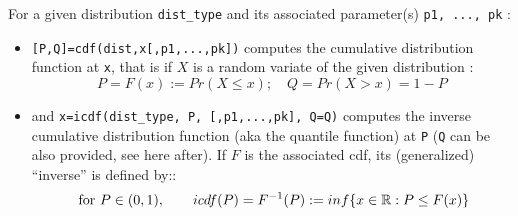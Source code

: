 \begin{mandescription}

For a given distribution \verb+dist_type+ and its associated parameter(s) \verb+p1, ..., pk+ :
\begin{itemize}
\item \verb![P,Q]=cdf(dist,x[,p1,...,pk])! computes the cumulative distribution function at \verb+x+, that
is if $X$ is a random variate of the given distribution :
$$
       P = F(x) := Pr ( X \le x ); \quad Q = Pr ( X > x ) = 1 - P
$$

\item and \verb!x=icdf(dist_type, P, [,p1,...,pk], Q=Q)! computes the inverse cumulative distribution function
(aka the quantile function) at \verb+P+ (\verb+Q+ can be also provided, see here after). If $F$ is the associated
cdf, its (generalized) ``inverse'' is defined by:: 
$$
\mbox{ for } P \in (0,1), \qquad   icdf(P) = F^{-1}(P) := inf \{ x \in \mathbb R : P \le F(x) \} 
$$
\end{itemize}


\end{mandescription}
